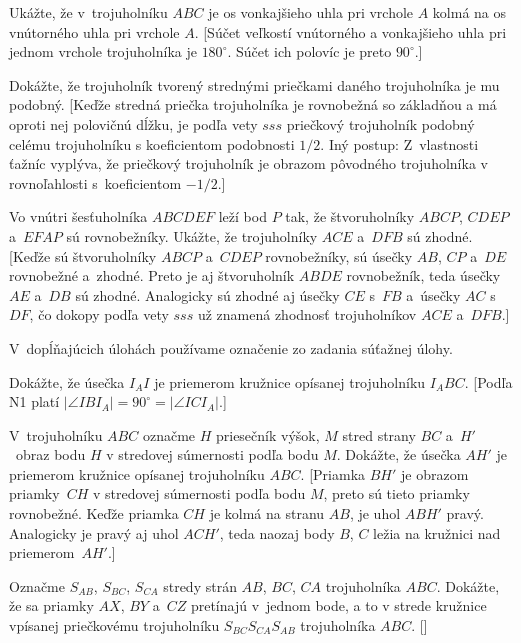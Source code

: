 {Ukážte, že v~trojuholníku $ABC$ je os vonkajšieho uhla pri vrchole $A$ kolmá na os vnútorného uhla pri vrchole $A$.
 [Súčet veľkostí vnútorného a vonkajšieho uhla pri jednom vrchole trojuholníka je $180^\circ$. Súčet ich polovíc je preto $90^\circ$.]

Dokážte, že trojuholník tvorený strednými priečkami daného trojuholníka je mu podobný.
 [Keďže stredná priečka trojuholníka je rovnobežná so základňou a má oproti nej polovičnú dĺžku, je podľa vety $sss$ priečkový trojuholník podobný celému trojuholníku s koeficientom podobnosti $1/2$. Iný postup: Z~vlastnosti ťažníc vyplýva, že priečkový trojuholník je obrazom pôvodného trojuholníka v rovnoľahlosti s~koeficientom ${-1/2}$.]

Vo vnútri šesťuholníka $ABCDEF$ leží bod $P$ tak, že štvoruholníky $ABCP$, $CDEP$ a~$EFAP$ sú rovnobežníky. Ukážte, že trojuholníky $ACE$ a~$DFB$ sú zhodné.
 [Keďže sú štvoruholníky $ABCP$ a~$CDEP$ rovnobežníky, sú úsečky $AB$, $CP$ a~$DE$ rovnobežné a~zhodné. Preto je aj štvoruholník $ABDE$ rovnobežník, teda úsečky $AE$ a~$DB$ sú zhodné. Analogicky sú zhodné aj úsečky $CE$ s~$FB$ a~úsečky $AC$ s~$DF$, čo dokopy podľa vety $sss$ už znamená zhodnosť trojuholníkov $ACE$ a~$DFB$.]

\D

{\everypar{}
\smallskip
V~dopĺňajúcich úlohách používame označenie zo zadania súťažnej úlohy.
\smallskip
}

Dokážte, že úsečka $I_AI$ je priemerom kružnice opísanej trojuholníku $I_ABC$.
 [Podľa N1 platí $|\angle IBI_A|=90^\circ=|\angle ICI_A|$.]

V~trojuholníku $ABC$ označme $H$ priesečník výšok, $M$ stred strany $BC$ a~$H'$~obraz bodu $H$ v stredovej súmernosti podľa bodu $M$. Dokážte, že úsečka $AH'$ je priemerom kružnice opísanej trojuholníku $ABC$.
 [Priamka $BH'$ je obrazom priamky~$CH$ v stredovej súmernosti podľa bodu $M$, preto sú tieto priamky rovnobežné. Keďže priamka $CH$ je kolmá na stranu $AB$, je uhol $ABH'$ pravý. Analogicky je pravý aj uhol $ACH'$, teda naozaj body $B$, $C$ ležia na kružnici nad priemerom~$AH'$.]

Označme $S_{AB}$, $S_{BC}$, $S_{CA}$ stredy strán $AB$, $BC$, $CA$ trojuholníka $ABC$. Dokážte, že sa priamky $AX$, $BY$ a~$CZ$ pretínajú v~jednom bode, a to v strede kružnice vpísanej priečkovému trojuholníku $S_{BC}S_{CA}S_{AB}$ trojuholníka $ABC$.
 []

}
